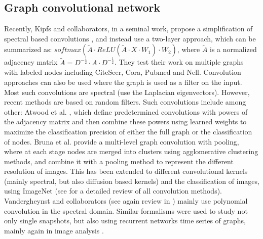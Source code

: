 \subsection*{Graph convolutional network}
Recently, Kipfs and collaborators, in a seminal work, propose a simplification of spectral based convolutions \cite{thomas2016semi}\cite{schlichtkrull2017modeling}, and instead use a two-layer approach, which can be summarized as: $softmax(\tilde{A}\cdot ReLU(\tilde{A}\cdot X\cdot W_{1})\cdot W_{2})$, where $\tilde{A}$ is a normalized adjacency matrix $\tilde{A}=D^{-\frac{1}{2}}\cdot A\cdot D^{-\frac{1}{2}}$. They test their work on multiple graphs with labeled nodes including CiteSeer, Cora, Pubmed and Nell.  Convolution approaches can also be used where the graph is used as a filter on the input. Most such convolutions are spectral (use the Laplacian eigenvectors). However, recent methods are based on random filters. Such convolutions include among other:  Atwood et al. \cite{Atwood2016}, which define predetermined convolutions with powers of the adjacency matrix and then combine these powers using learned weights to maximize the classification precision of either the full graph or the classification of nodes. Bruna et al.  \cite{bruna2013spectral} provide a multi-level graph convolution with pooling, where at each stage nodes are merged into clusters using agglomerative clustering methods, and combine it with a pooling method to represent the different resolution of images. This has been extended \cite{henaff2015deep}\cite{bronstein2016geometric}  to different convolutional kernels (mainly spectral, but also diffusion based kernels) and the classification of images, using ImageNet (see \cite{bronstein2016geometric} for a detailed review of all convolution methods).  Vandergheynst and collaborators (see again review in \cite{bronstein2016geometric}) mainly use polynomial convolution in the spectral domain. Similar formalisms were used to study not only single snapshots, but also using recurrent networks time series of graphs, mainly again in image analysis \cite{Seo2018}.


